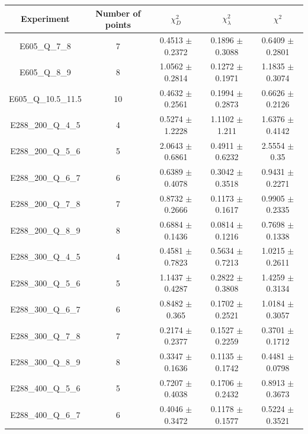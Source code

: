 \documentclass[
]{article}
\begin{document}
\begin{table}[h]

\centering

\begin{tabular}{|c|c|c|c|c|} \hline

\textbf{Experiment} & \textbf{Number of
points} & \textbf{\(\chi_{D}^2\)} & \textbf{\(\chi_{\lambda}^2\)} & \textbf{\(\chi^2\)} \\ \hline

E605\_Q\_7\_8 & 7 & 0.4513 \(\pm\) 0.2372 & 0.1896 \(\pm\)
0.3088 & 0.6409 \(\pm\) 0.2801 \\ \hline
E605\_Q\_8\_9 & 8 & 1.0562 \(\pm\) 0.2814 & 0.1272 \(\pm\)
0.1971 & 1.1835 \(\pm\) 0.3074 \\ \hline
E605\_Q\_10.5\_11.5 & 10 & 0.4632 \(\pm\) 0.2561 & 0.1994 \(\pm\)
0.2873 & 0.6626 \(\pm\) 0.2126 \\ \hline
E288\_200\_Q\_4\_5 & 4 & 0.5274 \(\pm\) 1.2228 & 1.1102 \(\pm\)
1.211 & 1.6376 \(\pm\) 0.4142 \\ \hline
E288\_200\_Q\_5\_6 & 5 & 2.0643 \(\pm\) 0.6861 & 0.4911 \(\pm\)
0.6232 & 2.5554 \(\pm\) 0.35 \\ \hline
E288\_200\_Q\_6\_7 & 6 & 0.6389 \(\pm\) 0.4078 & 0.3042 \(\pm\)
0.3518 & 0.9431 \(\pm\) 0.2271 \\ \hline
E288\_200\_Q\_7\_8 & 7 & 0.8732 \(\pm\) 0.2666 & 0.1173 \(\pm\)
0.1617 & 0.9905 \(\pm\) 0.2335 \\ \hline
E288\_200\_Q\_8\_9 & 8 & 0.6884 \(\pm\) 0.1436 & 0.0814 \(\pm\)
0.1216 & 0.7698 \(\pm\) 0.1338 \\ \hline
E288\_300\_Q\_4\_5 & 4 & 0.4581 \(\pm\) 0.7823 & 0.5634 \(\pm\)
0.7213 & 1.0215 \(\pm\) 0.2611 \\ \hline
E288\_300\_Q\_5\_6 & 5 & 1.1437 \(\pm\) 0.4287 & 0.2822 \(\pm\)
0.3808 & 1.4259 \(\pm\) 0.3134 \\ \hline
E288\_300\_Q\_6\_7 & 6 & 0.8482 \(\pm\) 0.365 & 0.1702 \(\pm\)
0.2521 & 1.0184 \(\pm\) 0.3057 \\ \hline
E288\_300\_Q\_7\_8 & 7 & 0.2174 \(\pm\) 0.2377 & 0.1527 \(\pm\)
0.2259 & 0.3701 \(\pm\) 0.1712 \\ \hline
E288\_300\_Q\_8\_9 & 8 & 0.3347 \(\pm\) 0.1636 & 0.1135 \(\pm\)
0.1742 & 0.4481 \(\pm\) 0.0798 \\ \hline
E288\_400\_Q\_5\_6 & 5 & 0.7207 \(\pm\) 0.4038 & 0.1706 \(\pm\)
0.2432 & 0.8913 \(\pm\) 0.3673 \\ \hline
E288\_400\_Q\_6\_7 & 6 & 0.4046 \(\pm\) 0.3472 & 0.1178 \(\pm\)
0.1577 & 0.5224 \(\pm\) 0.3521 \\ \hline

\end{tabular}
\end{table}
\end{document}
